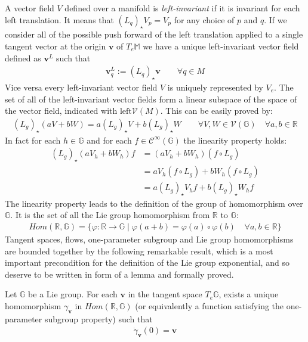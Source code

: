 A vector field $V$ defined over a manifold is \emph{left-invariant} if it is invariant for each left translation. It means that $(L_{q})_{\star} V_{p} = V_{p}$ for any choice of $p$ and $q$. If we consider all of the possible push forward of the left translation applied to a single tangent vector at the origin $\mathbf{v}$ of $T_{e}\mathbb{M}$ we have a unique left-invariant vector field defined as $\mathbf{v}^{L}$ such that
\begin{align*}
\mathbf{v}^{L}_{q} := (L_{q})_{\star} \mathbf{v} \qquad \forall q \in M
\end{align*}
Vice versa every left-invariant vector field $V$ is uniquely represented by $V_{e}$.
The set of all of the left-invariant vector fields form a linear subspace of the space of the vector field, indicated with $\text{left}\mathcal{V}(M)$. This can be easily proved by:
\begin{align*}
(L_{g})_{\star} (aV +bW) = a (L_{g})_{\star} V + b (L_{g})_{\star} W
\qquad 
\forall V, W \in \mathcal{V}(\mathbb{G}) 
\quad 
\forall a, b \in \mathbb{R}
\end{align*}
In fact for each $h \in \mathbb{G}$ and for each $f \in \mathcal{C}^{\infty}(\mathbb{G})$ the linearity property holds:
\begin{align*}
(L_{g})_{\star} (aV_{h} +bW_{h})f &= (aV_{h} +bW_{h})(f\circ L_{g} ) \\
&= aV_{h}(f\circ L_{g} ) +bW_{h}(f\circ L_{g} ) \\
&= a (L_{g})_{\star} V_{h}f + b (L_{g})_{\star} W_{h}f  
\end{align*}
The linearity property leads to the definition of the group of homomorphism over $\mathbb{G}$. It is the set of all the Lie group homomorphism from $\mathbb{R}$ to $\mathbb{G}$:
\begin{align*}
Hom(\mathbb{R},\mathbb{G}) = \lbrace \varphi: \mathbb{R} \rightarrow \mathbb{G} \mid \varphi(a+b) = \varphi(a) \circ \varphi(b)\phantom{aa} \forall a,b \in \mathbb{R} \rbrace
\end{align*}
Tangent spaces, flows, one-parameter subgroup and Lie group homomorphisms are bounded together by the following remarkable result, which is a most important precondition for the definition of the Lie group exponential, and so deserve to be written in form of a lemma and formally proved. 
\begin{lemma}
	Let $\mathbb{G}$ be a Lie group. For each $\mathbf{v}$ in the tangent space $T_{e}\mathbb{G}$, exists a unique homomorphism $\gamma_{\mathbf{v}}$ in $Hom(\mathbb{R},\mathbb{G})$ (or equivalently a function satisfying the one-parameter subgroup property) such that 
	\begin{align*}
	\dot{\gamma}_{\mathbf{v}}(0) = \mathbf{v}
	\end{align*}
\end{lemma}
